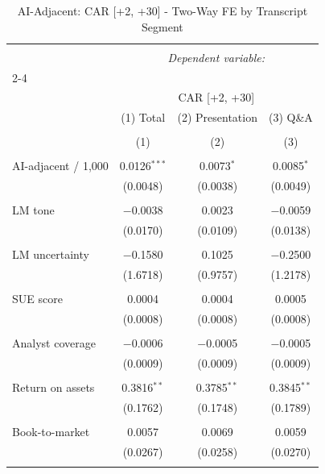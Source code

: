 
\begin{table}[!htbp] \centering 
  \caption{AI-Adjacent: CAR [+2, +30] - Two-Way FE by Transcript Segment} 
  \label{} 
\begin{tabular}{@{\extracolsep{5pt}}lccc} 
\\[-1.8ex]\hline 
\hline \\[-1.8ex] 
 & \multicolumn{3}{c}{\textit{Dependent variable:}} \\ 
\cline{2-4} 
\\[-1.8ex] & \multicolumn{3}{c}{CAR [+2, +30]} \\ 
 & (1) Total & (2) Presentation & (3) Q\&A \\ 
\\[-1.8ex] & (1) & (2) & (3)\\ 
\hline \\[-1.8ex] 
 AI-adjacent / 1,000 & 0.0126$^{***}$ & 0.0073$^{*}$ & 0.0085$^{*}$ \\ 
  & (0.0048) & (0.0038) & (0.0049) \\ 
  & & & \\ 
 LM tone & $-$0.0038 & 0.0023 & $-$0.0059 \\ 
  & (0.0170) & (0.0109) & (0.0138) \\ 
  & & & \\ 
 LM uncertainty & $-$0.1580 & 0.1025 & $-$0.2500 \\ 
  & (1.6718) & (0.9757) & (1.2178) \\ 
  & & & \\ 
 SUE score & 0.0004 & 0.0004 & 0.0005 \\ 
  & (0.0008) & (0.0008) & (0.0008) \\ 
  & & & \\ 
 Analyst coverage & $-$0.0006 & $-$0.0005 & $-$0.0005 \\ 
  & (0.0009) & (0.0009) & (0.0009) \\ 
  & & & \\ 
 Return on assets & 0.3816$^{**}$ & 0.3785$^{**}$ & 0.3845$^{**}$ \\ 
  & (0.1762) & (0.1748) & (0.1789) \\ 
  & & & \\ 
 Book-to-market & 0.0057 & 0.0069 & 0.0059 \\ 
  & (0.0267) & (0.0258) & (0.0270) \\ 
  & & & \\ 

\end{tabular}
\end{table}
